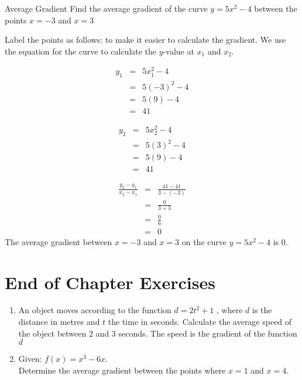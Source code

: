 \documentclass[10pt,a4paper,titlepage,twoside,openright]{report}
\begin{document}
\begin{wex}
{Average Gradient}
{Find the average gradient of the curve $y=5x^2-4$ between the points $x=-3$ and $x=3$}
{
Label the points as follows:
to make it easier to calculate the gradient.
We use the equation for the curve to calculate the $y$-value at $x_1$ and $x_2$.

\begin{eqnarray*}
y_1&=&5x_1^2-4\\
&=&5(-3)^2-4\\
&=&5(9)-4\\
&=&41
\end{eqnarray*}

\begin{eqnarray*}
y_2&=&5x_2^2-4\\
&=&5(3)^2-4\\
&=&5(9)-4\\
&=&41
\end{eqnarray*}

\begin{eqnarray*}
\frac{y_2-y_1}{x_2-x_1}&=&\frac{41-41}{3-(-3)}\\
&=&\frac{0}{3+3}\\
&=&\frac{0}{6}\\
&=&0
\end{eqnarray*}
The average gradient between $x=-3$ and $x=3$ on the curve $y=5x^2-4$ is 0.
}
\end{wex}

\section{End of Chapter Exercises}
\begin{enumerate}
\item{An object moves according to the function $d = 2t^2+1$ , where $d$ is the distance in metres and $t$ the time in seconds.  Calculate the average speed of the object between $2$ and $3$ seconds. The speed is the gradient of the function $d$}
\item{Given:  $f(x)=x^3-6x$.\\
Determine the average gradient between the points where $x = 1$  and $x = 4$.}
\end{enumerate}





\end{document}
